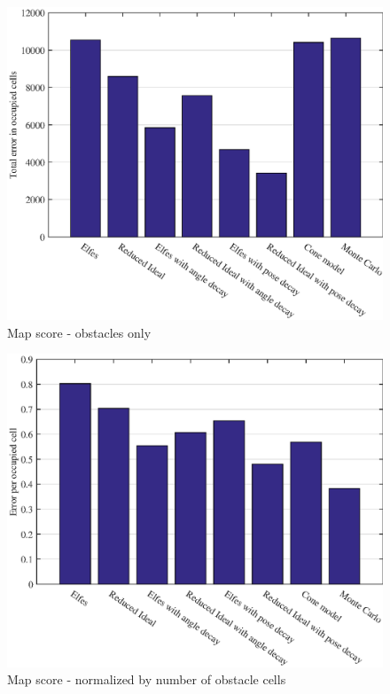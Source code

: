 \begin{figure}
	\centering
	\includegraphics[scale=1]{figures/static_mapping/comparison_obstacle_error}
	\caption{Map score - obstacles only}
	\label{fig:comparison_obstacle_error}
\end{figure}





\begin{figure}
	\centering
	\includegraphics[scale=1]{figures/static_mapping/comparison_obstacle_error_per_cell}
	\caption{Map score - normalized by number of obstacle cells}
	\label{fig:comparison_obstacle_error_per_cell}
\end{figure}


